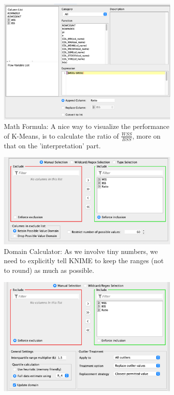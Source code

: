\documentclass[11pt]{article}
\begin{document}
\begin{figure}[H]
\begin{subfigure}{0.35\textwidth}
					\includegraphics[width=\textwidth]{res/t1/t15/t15-math-formula-conf}
					\caption{Math Formula: A nice way to visualize the performance of K-Means, is to calculate the ratio of $\frac{WSS}{BSS}$, more on that on the 'interpretation' part.}
					\label{fig:second}
				\end{subfigure}
				\hfill
				\begin{subfigure}{0.35\textwidth}
					\includegraphics[width=\textwidth]{res/t1/t15/t15-domain-calculator-conf}
					\caption{Domain Calculator: As we involve tiny numbers, we need to explicitly tell KNIME to keep the ranges (not to round) as much as possible.}
					\label{fig:third}
				\end{subfigure}	
				\begin{subfigure}{0.35\textwidth}
					\includegraphics[width=\textwidth]{res/t1/t15/t15-numeric-outliers-conf}

\end{subfigure}
\end{figure}
\end{document}
